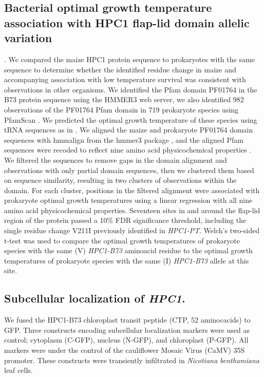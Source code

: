 \documentclass[9pt,twocolumn,twoside,lineno]{biorxiv}
\newcommand{\hpc}{\textit{HPC1}\xspace}
\begin{document}
\subsection{Bacterial optimal growth temperature association with HPC1 flap-lid domain allelic variation}.
We compared the maize HPC1 protein sequence to prokaryotes with the same sequence to determine whether the identified residue change in maize and accompanying association with low temperature survival was consistent with observations in other organisms. 
We identified the Pfam domain PF01764 in the B73 protein sequence using the HMMER3 web server, we also identified 982 observations of the PF01764 Pfam domain in 719 prokaryote species using PfamScan \cite{Potter2018-tk, El-Gebali2019-pw}. 
We predicted the optimal growth temperature of these species using tRNA sequences as in \cite{Cimen2020-dm}. 
We aligned the maize and prokaryote PF01764 domain sequences with hmmalign from the hmmer3 package \cite{Eddy2011-pd}, and the aligned Pfam sequences were recoded to reflect nine amino acid physicochemical properties \cite{Li2016-ut}. 
We filtered the sequences to remove gaps in the domain alignment and observations with only partial domain sequences, then we clustered them based on sequence similarity, resulting in two clusters of observations within the domain. 
For each cluster, positions in the filtered alignment were associated with prokaryote optimal growth temperatures using a linear regression with all nine amino acid physicochemical properties. 
Seventeen sites in and around the flap-lid region of the protein passed a 10\% FDR significance threshold, including the single residue change V211I previously identified in \textit{HPC1-PT}. 
Welch’s two-sided t-test was used to compare the optimal growth temperatures of prokaryote species with the same (V) \textit{HPC1-B73} aminoacid residue to the optimal growth temperatures of prokaryote species with the same (I) \textit{HPC1-B73} allele at this site.
\subsection{Subcellular localization of \hpc.}
We fused the HPC1-B73 chloroplast transit peptide (CTP, 52 aminocacids) to GFP. 
Three constructs encoding subcellular localization markers were used as control; cytoplasm (C-GFP), nucleus (N-GFP), and chloroplast (P-GFP).
All markers were under the control of the cauliflower Mosaic Virus (CaMV) 35S promoter. 
These constructs were transiently infiltrated in \textit{Nicotiana benthamiana} leaf cells.
\end{document}
